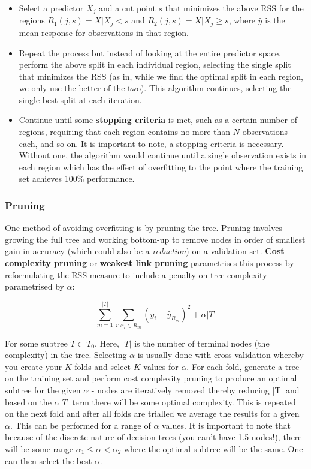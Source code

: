 \begin{itemize}
    \item Select a predictor $X_{j}$ and a cut point $s$ that minimizes the above RSS for the regions $R_{1}(j,s)={X|X_{j}<s}$ and $R_{2}(j,s)={X|X_{j}\ge s}$, where $\hat{y}$ is the mean response for observations in that region.
    \item Repeat the process but instead of looking at the entire predictor space, perform the above split in each individual region, selecting the single split that minimizes the RSS (as in, while we find the optimal split in each region, we only use the better of the two). This algorithm continues, selecting the single best split at each iteration.
    \item Continue until some \textbf{stopping criteria} is met, such as a certain number of regions, requiring that each region contains no more than $N$ observations each, and so on. It is important to note, a stopping criteria is necessary. Without one, the algorithm would continue until a single observation exists in each region which has the effect of overfitting to the point where the training set achieves 100\% performance.
\end{itemize}

\subsubsection{Pruning}

One method of avoiding overfitting is by pruning the tree. Pruning involves growing the full tree and working bottom-up to remove nodes in order of smallest gain in accuracy (which could also be a \textit{reduction}) on a validation set. \textbf{Cost complexity pruning} or \textbf{weakest link pruning} parametrises this process by reformulating the RSS measure to include a penalty on tree complexity parametrised by $\alpha$:

$$ \sum^{|T|}_{m=1}\sum_{i:x_{i}\in R_{m}} (y_{i}-\hat{y}_{R_{m}})^{2} + \alpha|T| $$

For some subtree $T\subset T_{0}$. Here, $|T|$ is the number of terminal nodes (the complexity) in the tree. Selecting $\alpha$ is usually done with cross-validation whereby you create your $K$-folds and select $K$ values for $\alpha$. For each fold, generate a tree on the training set and perform cost complexity pruning to produce an optimal subtree for the given $\alpha$ - nodes are iteratively removed thereby reducing |T| and based on the $\alpha|T|$ term there will be some optimal complexity. This is repeated on the next fold and after all folds are trialled we average the results for a given $\alpha$. This can be performed for a range of $\alpha$ values. It is important to note that because of the discrete nature of decision trees (you can't have 1.5 nodes!), there will be some range $\alpha_{1}\le \alpha < \alpha_{2}$ where the optimal subtree will be the same. One can then select the best $\alpha$.
